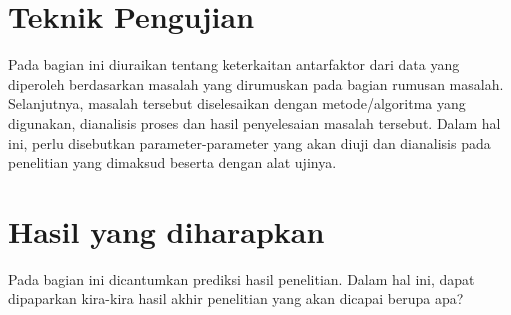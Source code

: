 \section{Teknik Pengujian}
Pada bagian ini diuraikan tentang keterkaitan antarfaktor dari data yang diperoleh  berdasarkan masalah yang dirumuskan pada bagian rumusan masalah. Selanjutnya,  masalah tersebut diselesaikan dengan metode/algoritma yang digunakan, dianalisis proses dan hasil penyelesaian masalah tersebut.  Dalam hal ini, perlu disebutkan parameter-parameter yang akan diuji dan dianalisis pada penelitian yang dimaksud beserta dengan alat ujinya.

\section{Hasil yang diharapkan}
Pada bagian ini dicantumkan prediksi hasil penelitian. Dalam hal ini, dapat dipaparkan kira-kira hasil akhir penelitian yang akan dicapai berupa apa?